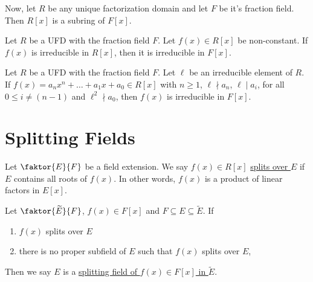 \documentclass[11pt]{article}
\newcommand{\quotient}[2]{\faktor{#1}{#2}}
\begin{document}
\sectionline
Now, let $R$ be any unique factorization domain and let $F$ be it's fraction
field. Then $R[x]$ is a subring of $F[x]$.
\begin{lemma*} 
Let $R$ be a UFD with the fraction field $F$. Let $f(x) \in R[x]$ be
non-constant. If $f(x)$ is irreducible in $R[x]$, then it is irreducible in
$F[x]$.
\end{lemma*}
\begin{theorem} 
Let $R$ be a UFD with the fraction field $F$. Let $\ell$ be an irreducible
element of $R$. If $f(x) = a_nx^n + \dots + a_1x + a_0 \in R[x]$ with $n \geq
1$, $\ell \nmid a_n$, $\ell \mid a_i$, for all $0 \leq i \neq (n-1)$ and
$\ell^2 \nmid a_0$, then $f(x)$ is irreducible in $F[x]$.
\end{theorem}

\pagebreak
\section{Splitting Fields}
\begin{definition}
Let $\quotient{E}{F}$ be a field extension. We say $f(x) \in R[x]$
\underline{splits over $E$} if $E$ contains all roots of $f(x)$. In other words,
$f(x)$ is a product of linear factors in $E[x]$.
\end{definition}
\begin{definition}
Let $\quotient{\tilde{E}}{F}$, $f(x) \in F[x]$ and $F \subseteq E \subseteq
\tilde E$. If
\begin{enumerate}
\item $f(x)$ splits over $E$
\item there is no proper subfield of $E$ such that $f(x)$ splits over $E$, 
\end{enumerate}
Then we say $E$ is a \underline{splitting field of $f(x) \in F[x]$ in $\tilde
E$}.
\end{definition}
\end{document}
